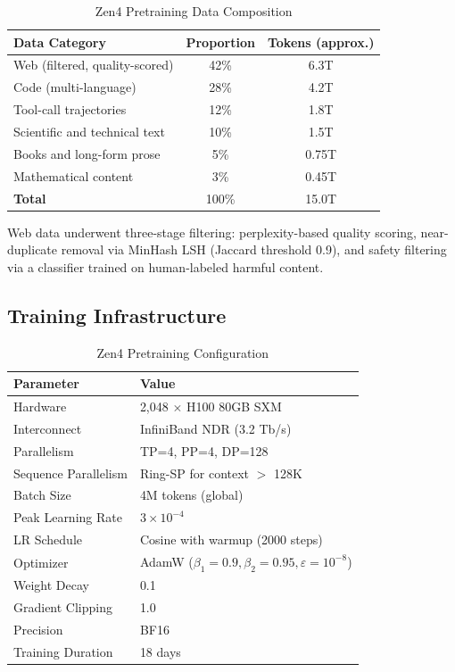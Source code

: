 \documentclass[11pt,a4paper]{article}
\begin{document}
\begin{table}[H]
\centering
\begin{tabular}{lcc}
\toprule
\textbf{Data Category} & \textbf{Proportion} & \textbf{Tokens (approx.)} \\
\midrule
Web (filtered, quality-scored) & 42\%  & 6.3T \\
Code (multi-language)          & 28\%  & 4.2T \\
Tool-call trajectories         & 12\%  & 1.8T \\
Scientific and technical text  & 10\%  & 1.5T \\
Books and long-form prose      & 5\%   & 0.75T \\
Mathematical content           & 3\%   & 0.45T \\
\midrule
\textbf{Total}                 & 100\% & 15.0T \\
\bottomrule
\end{tabular}
\caption{Zen4 Pretraining Data Composition}
\end{table}

Web data underwent three-stage filtering: perplexity-based quality scoring, near-duplicate
removal via MinHash LSH (Jaccard threshold 0.9), and safety filtering via a classifier
trained on human-labeled harmful content.

\subsection{Training Infrastructure}

\begin{table}[H]
\centering
\begin{tabular}{ll}
\toprule
\textbf{Parameter} & \textbf{Value} \\
\midrule
Hardware             & 2,048 $\times$ H100 80GB SXM \\
Interconnect         & InfiniBand NDR (3.2 Tb/s) \\
Parallelism          & TP=4, PP=4, DP=128 \\
Sequence Parallelism & Ring-SP for context $>$ 128K \\
Batch Size           & 4M tokens (global) \\
Peak Learning Rate   & $3 \times 10^{-4}$ \\
LR Schedule          & Cosine with warmup (2000 steps) \\
Optimizer            & AdamW ($\beta_1=0.9, \beta_2=0.95, \varepsilon=10^{-8}$) \\
Weight Decay         & 0.1 \\
Gradient Clipping    & 1.0 \\
Precision            & BF16 \\
Training Duration    & 18 days \\
\bottomrule
\end{tabular}
\caption{Zen4 Pretraining Configuration}
\end{table}
\end{document}
